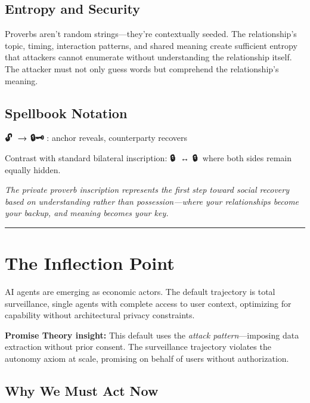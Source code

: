 \documentclass[
  11pt,
]{article}
\begin{document}
\subsection{Entropy and Security}\label{entropy-and-security}

Proverbs aren't random strings---they're contextually seeded. The
relationship's topic, timing, interaction patterns, and shared meaning
create sufficient entropy that attackers cannot enumerate without
understanding the relationship itself. The attacker must not only guess
words but comprehend the relationship's meaning.

\subsection{Spellbook Notation}\label{spellbook-notation}

\textbf{🔓📝 → 🔒🗝️} : anchor reveals, counterparty recovers

Contrast with standard bilateral inscription: \textbf{🔒📝 ↔ 🔒📝} where
both sides remain equally hidden.

\emph{The private proverb inscription represents the first step toward
social recovery based on understanding rather than possession---where
your relationships become your backup, and meaning becomes your key.}

\begin{center}\rule{0.5\linewidth}{0.5pt}\end{center}

\section{The Inflection Point}\label{the-inflection-point}

AI agents are emerging as economic actors. The default trajectory is
total surveillance, single agents with complete access to user context,
optimizing for capability without architectural privacy constraints.

\textbf{Promise Theory insight:} This default uses the \emph{attack
pattern}---imposing data extraction without prior consent. The
surveillance trajectory violates the autonomy axiom at scale, promising
on behalf of users without authorization.

\subsection{Why We Must Act Now}\label{why-we-must-act-now}
\end{document}

